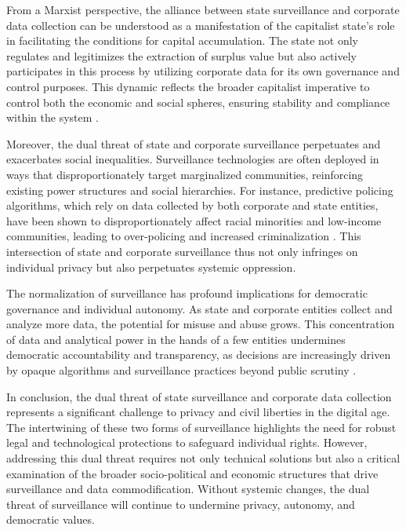 From a Marxist perspective, the alliance between state surveillance and corporate data collection can be understood as a manifestation of the capitalist state's role in facilitating the conditions for capital accumulation. The state not only regulates and legitimizes the extraction of surplus value but also actively participates in this process by utilizing corporate data for its own governance and control purposes. This dynamic reflects the broader capitalist imperative to control both the economic and social spheres, ensuring stability and compliance within the system \cite[pp.~329-332]{harvey2005brief}.

Moreover, the dual threat of state and corporate surveillance perpetuates and exacerbates social inequalities. Surveillance technologies are often deployed in ways that disproportionately target marginalized communities, reinforcing existing power structures and social hierarchies. For instance, predictive policing algorithms, which rely on data collected by both corporate and state entities, have been shown to disproportionately affect racial minorities and low-income communities, leading to over-policing and increased criminalization \cite[pp.~97-100]{eubanks2018automating}. This intersection of state and corporate surveillance thus not only infringes on individual privacy but also perpetuates systemic oppression.

The normalization of surveillance has profound implications for democratic governance and individual autonomy. As state and corporate entities collect and analyze more data, the potential for misuse and abuse grows. This concentration of data and analytical power in the hands of a few entities undermines democratic accountability and transparency, as decisions are increasingly driven by opaque algorithms and surveillance practices beyond public scrutiny \cite[pp.~73-76]{pasquale2016black}.

In conclusion, the dual threat of state surveillance and corporate data collection represents a significant challenge to privacy and civil liberties in the digital age. The intertwining of these two forms of surveillance highlights the need for robust legal and technological protections to safeguard individual rights. However, addressing this dual threat requires not only technical solutions but also a critical examination of the broader socio-political and economic structures that drive surveillance and data commodification. Without systemic changes, the dual threat of surveillance will continue to undermine privacy, autonomy, and democratic values.

